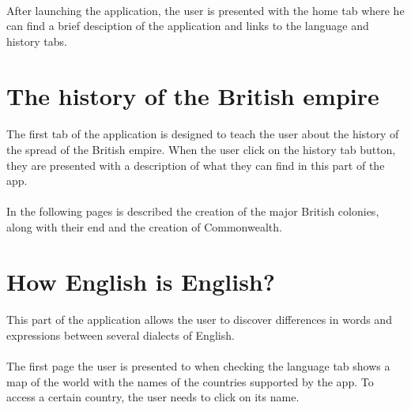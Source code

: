 \documentclass[11pt, a4paper]{report}
\begin{document}
\paragraph{}After launching the application, the user is presented with the home tab where he can find a brief desciption of the application and links to the language and history tabs.

\section*{The history of the British empire}
\paragraph{}The first tab of the application is designed to teach the user about the history of the spread of the British empire. When the user click on the history tab button, they are presented with a description of what they can find in this part of the app. 

\paragraph{}In the following pages is described the creation of the major British colonies, along with their end and the creation of Commonwealth.


\section*{How English is English?}
\paragraph{}This part of the application allows the user to discover differences in words and expressions between several dialects of English.

\paragraph{}The first page the user is presented to when checking the language tab shows a map of the world with the names of the countries supported by the app. To access a certain country, the user needs to click on its name.
\end{document}
